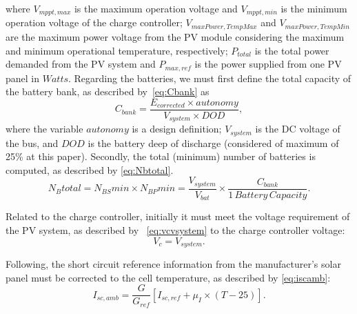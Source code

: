 \documentclass[10pt,conference]{IEEEtran}
\begin{document}
\noindent where $V_{mppt,max}$ is the maximum operation voltage and $V_{mppt,min}$ is the minimum operation voltage of the charge controller; $V_{maxPower,TempMax}$ and $V_{maxPower,TempMin}$ are the maximum power voltage from the PV module considering the maximum and minimum operational temperature, respectively; $P_{total}$ is the total power demanded from the PV system and $P_{max,ref}$ is the power supplied from one PV panel in $Watts$.
%
Regarding the batteries, we must first define the total capacity of the battery bank, as described by~\eqref{eq:Cbank} as
\begin{equation}
\label{eq:Cbank}
\scriptstyle C_{bank} \scriptstyle = \dfrac{\scriptstyle E_{corrected} \scriptstyle \times \scriptstyle autonomy}{\scriptstyle V_{system} \scriptstyle \times \scriptstyle DOD},
\end{equation}
%
\noindent where the variable $autonomy$ is a design definition; %
$ V_{system} $ is the DC voltage of the bus, and $ DOD $ is the battery deep of discharge (considered of maximum of 25\% at this paper).
%
Secondly, the total (minimum) number of batteries is computed, as described by \eqref{eq:Nbtotal}. 
\begin{equation}
\label{eq:Nbtotal}
\scriptstyle N_{B}total = \scriptstyle N_{BS}min \scriptstyle \times \scriptstyle N_{BP}min = \dfrac{\scriptstyle V_{system}}{\scriptstyle V_{bat}} \scriptstyle \times \dfrac{\scriptstyle C_{bank}}{\scriptstyle 1 \,Battery \, Capacity}.
\end{equation}

Related to the charge controller, initially it must meet the voltage requirement of the PV system, as described by ~\eqref{eq:vcvsystem} to the charge controller voltage: 
\begin{equation}
\label{eq:vcvsystem}
\scriptstyle V_{c} = \scriptstyle V_{system}.
\end{equation}

Following, the short circuit reference information from the manufacturer's solar panel must be corrected to the cell temperature, as described by \eqref{eq:iscamb}:
%
\begin{equation}
\label{eq:iscamb}
\scriptstyle I_{sc,amb} = \dfrac{\scriptstyle G}{\scriptstyle G_{ref}} \left[ \scriptstyle I_{sc,ref} + \scriptstyle \mu_{I} \scriptstyle \times \scriptstyle (T-25) \right]. 
\end{equation}
\end{document}
